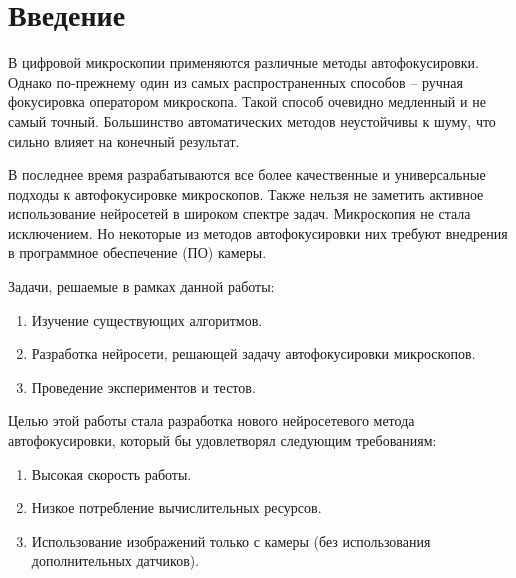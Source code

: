 \chapter*{Введение} %

В цифровой микроскопии применяются различные методы автофокусировки. Однако по-прежнему один из самых распространенных способов -- ручная фокусировка оператором микроскопа. Такой способ очевидно медленный и не самый точный. Большинство автоматических методов неустойчивы к шуму, что сильно влияет на конечный результат.

В последнее время разрабатываются все более качественные и универсальные подходы к автофокусировке микроскопов. Также нельзя не заметить активное использование нейросетей в широком спектре задач. Микроскопия не стала исключением. Но некоторые из методов автофокусировки них требуют внедрения в программное обеспечение (ПО) камеры.

Задачи, решаемые в рамках данной работы:
\begin{enumerate}
	\item Изучение существующих алгоритмов.
	\item Разработка нейросети, решающей задачу автофокусировки микроскопов.
	\item Проведение экспериментов и тестов.
\end{enumerate} 

Целью этой работы стала разработка нового нейросетевого метода автофокусировки, который бы удовлетворял следующим требованиям:
\begin{enumerate}
	\item Высокая скорость работы.
	\item Низкое потребление вычислительных ресурсов.
	\item Использование изображений только с камеры (без использования дополнительных датчиков).
\end{enumerate}


